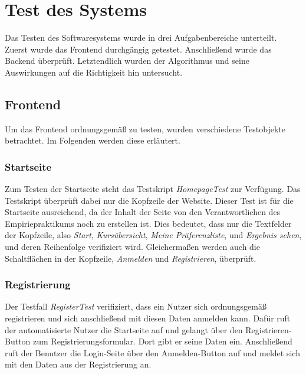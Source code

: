 \chapter{Test des Systems}
\label{chapter:testing}

	Das Testen des Softwaresystems wurde in drei Aufgabenbereiche unterteilt.
	Zuerst wurde das Frontend durchgängig getestet.
	Anschließend wurde das Backend überprüft.
	Letztendlich wurden der Algorithmus und seine Auswirkungen auf die Richtigkeit hin untersucht.\newline
	
	\section{Frontend}
		Um das Frontend ordnungsgemäß zu testen, wurden verschiedene Testobjekte betrachtet.
		Im Folgenden werden diese erläutert.
		
		\subsection{Startseite}
			Zum Testen der Startseite steht das Testskript \textit{HomepageTest} zur Verfügung.
			Das Testskript überprüft dabei nur die Kopfzeile der Website.
            Dieser Test ist für die Startseite ausreichend, da der Inhalt der Seite von den Verantwortlichen des Empiriepraktikums noch zu erstellen ist.
			Dies bedeutet, dass nur die Textfelder der Kopfzeile, also \textit{Start}, \textit{Kursübersicht}, \textit{Meine Präferenzliste}, und \textit{Ergebnis sehen}, und deren Reihenfolge verifiziert wird.
			Gleichermaßen werden auch die Schaltflächen in der Kopfzeile, \textit{Anmelden} und \textit{Registrieren}, überprüft.
		
		\subsection{Registrierung}
			Der Testfall \textit{RegisterTest} verifiziert, dass ein Nutzer sich ordnungsgemäß registrieren und sich anschließend mit diesen Daten anmelden kann.
			Dafür ruft der automatisierte Nutzer die Startseite auf und gelangt über den \glqq Registrieren\grqq -Button zum Registrierungsformular.
			Dort gibt er seine Daten ein.
			Anschließend ruft der Benutzer die Login-Seite über den \glqq Anmelden\grqq -Button auf und meldet sich mit den Daten aus der Registrierung an.
            
